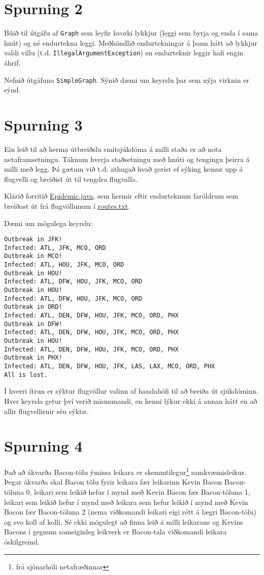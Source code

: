 \documentclass{article}
\begin{document}
\section{Spurning 2}
Búið til útgáfu af \texttt{Graph} sem leyfir hvorki lykkjur (leggi sem byrja og enda í sama hnút) og né endurtekna leggi. Meðhöndlið endurtekningar á þann hátt að lykkjur valdi villu (t.d. \texttt{IllegalArgumentException}) en endurteknir leggir hafi engin áhrif. 

Nefnið útgáfuna \texttt{SimpleGraph}. Sýnið dæmi um keyrslu þar sem nýja virknin er sýnd.

\section{Spurning 3}
Ein leið til að herma útbreiðslu smitsjúkdóma á milli staða er að nota netaframsetningu. Táknum hverja staðsetningu með hnúti og tengingu þeirra á milli með legg. Þá gætum við t.d. athugað hvað gerist ef sýking kemur upp á flugvelli og breiðist út til tengdra flugvalla.

Klárið forritið \href{https://github.com/Ernir/kennsluefni/tree/master/T2/Code/w10/Epidemic.java}{Epidemic.java}, sem hermir eftir endurteknum faröldrum sem breiðast út frá flugvöllunum í \href{https://github.com/Ernir/kennsluefni/tree/master/T2/Code/w10/routes.txt}{routes.txt}.

Dæmi um mögulega keyrslu:
\begin{verbatim}
Outbreak in JFK!
Infected: ATL, JFK, MCO, ORD
Outbreak in MCO!
Infected: ATL, HOU, JFK, MCO, ORD
Outbreak in HOU!
Infected: ATL, DFW, HOU, JFK, MCO, ORD
Outbreak in HOU!
Infected: ATL, DFW, HOU, JFK, MCO, ORD
Outbreak in ORD!
Infected: ATL, DEN, DFW, HOU, JFK, MCO, ORD, PHX
Outbreak in DFW!
Infected: ATL, DEN, DFW, HOU, JFK, MCO, ORD, PHX
Outbreak in HOU!
Infected: ATL, DEN, DFW, HOU, JFK, MCO, ORD, PHX
Outbreak in PHX!
Infected: ATL, DEN, DFW, HOU, JFK, LAS, LAX, MCO, ORD, PHX
All is lost.
\end{verbatim}
Í hverri ítrun er sýktur flugvöllur valinn af handahófi til að breiða út sjúkdóminn. Hver keyrsla getur því verið mismunandi, en henni lýkur ekki á annan hátt en að allir flugvellirnir séu sýktir.

\section{Spurning 4}
Það að ákvarða Bacon-tölu ýmissa leikara er skemmtilegur\footnote{frá sjónarhóli netafræðinnar} samkvæmisleikur. Þegar ákvarða skal Bacon tölu fyrir leikara fær leikarinn Kevin Bacon Bacon-töluna 0, leikari sem leikið hefur í mynd með Kevin Bacon fær Bacon-töluna 1, leikari sem leikið hefur í mynd með leikara sem hefur leikið í mynd með Kevin Bacon fær Bacon-töluna 2 (nema viðkomandi leikari eigi rétt á lægri Bacon-tölu) og svo koll af kolli. Sé ekki mögulegt að finna leið á milli leikarans og Kevins Bacons í gegnum sameiginleg leikverk er Bacon-tala viðkomandi leikara óskilgreind.
\end{document}
